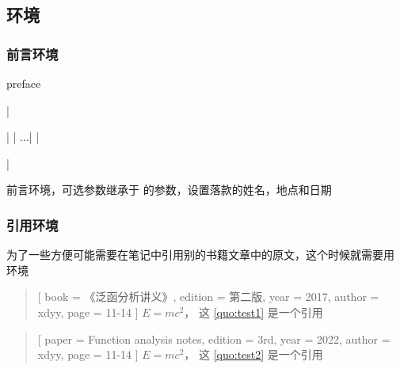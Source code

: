 \documentclass{xdyy-usermanual}
\begin{document}
\subsection{环境}

\subsubsection{ 前言环境  }
\begin{function}[added = 2022-02-17]{preface}
  \begin{syntax}
    |\begin{preface}[signature = {name = ..., place = ..., date = ...}]|
      |  ...|
    |\end{preface}|
  \end{syntax}
  前言环境，可选参数继承于  的参数，设置落款的姓名，地点和日期
\end{function}



\subsubsection{ 引用环境  }

为了一些方便可能需要在笔记中引用别的书籍文章中的原文，这个时候就需要用  环境

\begin{vexample}
    \begin{quotation}[
      book    = {《泛函分析讲义》},      %
      edition = {第二版},                %
      year    = {2017},                  %
      author  = {xdyy},                  %
      page    = {11-14}                  %
    ]\label{quo:test1}
      $E = m c^2$， 这 \ref{quo:test1} 是一个引用
    \end{quotation}
\end{vexample}

\begin{vexample}
    \begin{quotation}[
      paper   = {Function analysis notes},   %
      edition = {3rd},                       %
      year    = {2022},                      %
      author  = {xdyy},                      %
      page    = {11-14}                      %
    ]\label{quo:test2}
      $E = m c^2$， 这 \ref{quo:test2} 是一个引用
    \end{quotation}
\end{vexample}
\end{document}
